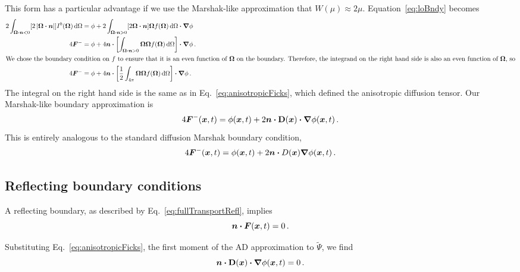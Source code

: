 This form has a particular advantage if we use the Marshak-like approximation
that $W(\mu)\approx 2\mu$. Equation~\eqref{eq:loBndy} becomes
\begin{align*}
  2\int_{\bm{\Omega}\bm{\cdot} \bm{n} < 0}
  [2\left| \bm{\Omega} \bm{\cdot} \bm{n} \right|] I^b(\bm{\Omega}) \mathop{}\!\mathrm{d}\Omega
  &= \phi
  + 2\int_{\bm{\Omega}\bm{\cdot} \bm{n} > 0} [2\bm{\Omega} \bm{\cdot} \bm{n}]
  \bm{\Omega} f(\bm{\Omega}) \mathop{}\!\mathrm{d}\Omega \bm{\cdot} \bm{\nabla} \phi
  \\
  4 \bm{F}^-
  &= \phi
  + 4 \bm{n} \bm{\cdot} \left[ \int_{\bm{\Omega}\bm{\cdot} \bm{n} > 0} \bm{\Omega}
  \bm{\Omega} f(\bm{\Omega}) \mathop{}\!\mathrm{d}\Omega \right] \bm{\cdot} \bm{\nabla} \phi \,.
  \\ 
  \intertext{We chose the boundary condition on $f$ to ensure that it is an
  even function of $\bm{\Omega}$ on the boundary. Therefore, the integrand on
  the right hand side is also an even function of $\bm{\Omega}$, so}
  4 \bm{F}^-
  &= \phi
  + 4 \bm{n} \bm{\cdot}  \left[ \frac{1}{2} \int_{4\pi}
  \bm{\Omega} \bm{\Omega} f(\bm{\Omega}) \mathop{}\!\mathrm{d}\Omega \right] \bm{\cdot} \bm{\nabla} \phi \,.
\end{align*}
The integral on the right hand side is the same as in
  Eq.~\eqref{eq:anisotropicFicks}, which defined the anisotropic diffusion
  tensor. Our Marshak-like boundary approximation is
\begin{equation}\label{eq:marshakAd}
  4 \bm{F}^-(\bm{x}, t)
  = \phi(\bm{x}, t)
  + 2 \bm{n} \bm{\cdot} \mathbf{D}(\bm{x}) \bm{\cdot} \bm{\nabla} \phi(\bm{x}, t) \,.
\end{equation}
This is entirely analogous to the standard diffusion Marshak boundary condition,
\begin{equation*}
  4 \bm{F}^-(\bm{x}, t) = \phi(\bm{x}, t) + 2 \bm{n} \bm{\cdot} D(\bm{x}) \bm{\nabla} \phi(\bm{x}, t)\,.
\end{equation*}

\subsection{Reflecting boundary conditions}
A reflecting boundary, as described by Eq.~\eqref{eq:fullTransportRefl}, 
implies
\begin{equation}\label{eq:reflFirst}
  \bm{n} \bm{\cdot} \bm{F}(\bm{x}, t) = 0\,.
\end{equation}

Substituting Eq.~\eqref{eq:anisotropicFicks}, the first moment of the AD
approximation to $\tilde\Psi$, we find
\begin{equation}\label{eq:reflLo1}
  \bm{n} \bm{\cdot} \mathbf{D}(\bm{x}) \bm{\cdot} \bm{\nabla} \phi(\bm{x}, t) = 0\,.
\end{equation}

